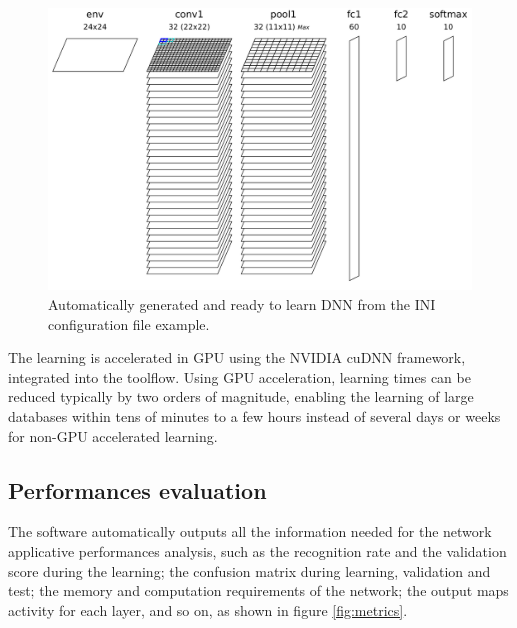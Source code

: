 \documentclass[a4paper,11pt,oneside]{article}
\begin{document}
\begin{figure}[!htb]
  \centering
  \includegraphics[width=0.75\linewidth]{figs/dnn_example.pdf}
  \caption{Automatically generated and ready to learn DNN from the INI
  configuration file example.}
  \label{fig:DNNExample}
\end{figure}

The learning is accelerated in GPU using the NVIDIA\textregistered{} cuDNN
framework, integrated into the toolflow. Using GPU acceleration, learning times
 can be reduced typically by two orders of magnitude, enabling the learning of
  large databases within tens of minutes to a few hours instead of several days
   or weeks for non-GPU accelerated learning.


\subsection{Performances evaluation}

The software automatically outputs all the information needed for the network
 applicative performances analysis, such as the recognition rate and the
 validation score during the learning; the confusion matrix during learning,
  validation and test; the memory and computation requirements of the network;
  the output maps activity for each layer, and so on, as shown in figure
   \ref{fig:metrics}.
\end{document}
